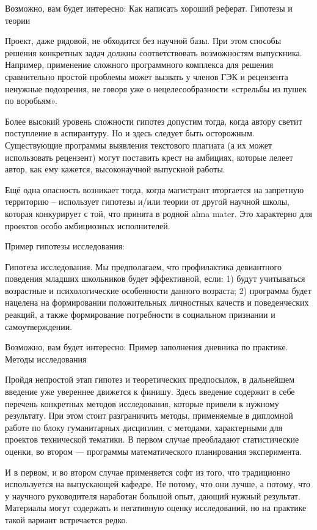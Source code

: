 Возможно, вам будет интересно: Как написать хороший реферат.
Гипотезы и теории

Проект, даже рядовой, не обходится без научной базы. При этом способы решения конкретных задач должны соответствовать возможностям выпускника. Например, применение  сложного программного комплекса для решения сравнительно простой проблемы  может вызвать у членов ГЭК и рецензента ненужные подозрения, не говоря уже о нецелесообразности «стрельбы из пушек по воробьям».

Более  высокий уровень сложности гипотез допустим тогда, когда автору светит поступление в аспирантуру. Но и здесь следует быть осторожным. Существующие программы выявления текстового плагиата (а их может использовать рецензент) могут поставить крест на амбициях, которые лелеет автор,  как ему кажется, высоконаучной выпускной работы.

Ещё одна опасность возникает тогда, когда магистрант вторгается на запретную территорию – использует гипотезы и/или теории от другой научной школы, которая конкурирует с той, что принята  в родной alma mater. Это характерно для проектов особо амбициозных исполнителей.

    Пример гипотезы исследования:

    Гипотеза исследования. Мы предполагаем, что профилактика девиантного поведения младших школьников будет эффективной, если:
    1) будут учитываться возрастные и психологические особенности данного возраста;
    2) программа будет нацелена на формировании положительных личностных качеств и поведенческих реакций, а также формирование потребности в социальном признании и самоутверждении.

Возможно, вам будет интересно: Пример заполнения дневника по практике.
Методы исследования

Пройдя непростой этап гипотез и теоретических предпосылок,  в дальнейшем  введение уже увереннее движется к финишу. Здесь введение содержит в себе перечень конкретных методов исследования, которые привели к нужному результату. При этом стоит разграничить методы, применяемые в дипломной работе по блоку гуманитарных дисциплин, с методами, характерными для проектов технической тематики. В первом случае преобладают статистические оценки, во втором — программы математического планирования эксперимента.

И в первом, и во втором случае применяется софт из того, что традиционно используется на выпускающей кафедре. Не потому, что они лучше, а потому, что у научного руководителя наработан большой опыт, дающий нужный результат. Материалы могут содержать и негативную оценку исследований, но на практике такой вариант встречается редко.

